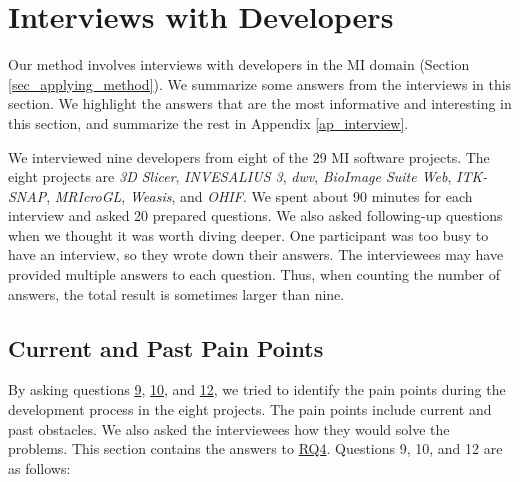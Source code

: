 \chapter{Interviews with Developers}
\label{ch_interview}

Our method involves interviews with developers in the MI domain (Section \ref{sec_applying_method}). We summarize some answers from the interviews in this section. We highlight the answers that are the most informative and interesting in this section, and summarize the rest in Appendix \ref{ap_interview}.

We interviewed nine developers from eight of the 29 MI software projects. The eight projects are \textit{3D Slicer}, \textit{INVESALIUS 3}, \textit{dwv}, \textit{BioImage Suite Web}, \textit{ITK-SNAP}, \textit{MRIcroGL}, \textit{Weasis}, and \textit{OHIF}. We spent about 90 minutes for each interview and asked 20 prepared questions. We also asked following-up questions when we thought it was worth diving deeper. One participant was too busy to have an interview, so they wrote down their answers. The interviewees may have provided multiple answers to each question. Thus, when counting the number of answers, the total result is sometimes larger than nine.

\section{Current and Past Pain Points}
\label{sec_interview_pain_points}

By asking questions \hyperlink{q9}{9}, \hyperlink{q10}{10}, and \hyperlink{q12}{12}, we tried to identify the pain points during the development process in the eight projects. The pain points include current and past obstacles. We also asked the interviewees how they would solve the problems. This section contains the answers to \hyperlink{rq4}{RQ4}. Questions 9, 10, and 12 are as follows:


